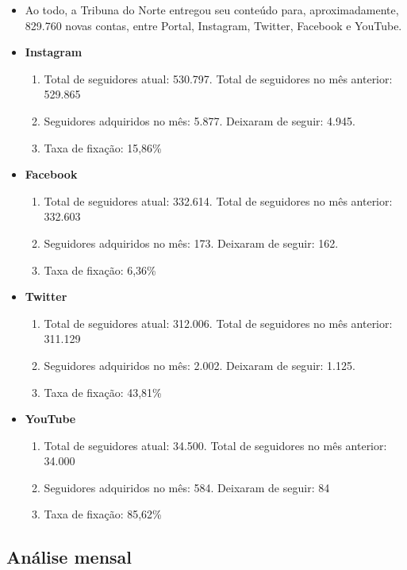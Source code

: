 \documentclass{article}%
\begin{document}
\begin{itemize}%
\item%
Ao todo, a Tribuna do Norte entregou seu conteúdo para, aproximadamente, 829.760 novas contas, entre Portal, Instagram, Twitter, Facebook e YouTube.%
\item%
\textbf{Instagram}%
\begin{enumerate}[label=-]%
\item%
Total de seguidores atual: 530.797. Total de seguidores no mês anterior: 529.865%
\item%
Seguidores adquiridos no mês: 5.877. Deixaram de seguir: 4.945.%
\item%
Taxa de fixação: 15,86\%%
\end{enumerate}%
\item%
\textbf{Facebook}%
\begin{enumerate}[label=-]%
\item%
Total de seguidores atual: 332.614. Total de seguidores no mês anterior: 332.603%
\item%
Seguidores adquiridos no mês: 173. Deixaram de seguir: 162.%
\item%
Taxa de fixação: 6,36\%%
\end{enumerate}%
\item%
\textbf{Twitter}%
\begin{enumerate}[label=-]%
\item%
Total de seguidores atual: 312.006. Total de seguidores no mês anterior: 311.129%
\item%
Seguidores adquiridos no mês: 2.002. Deixaram de seguir: 1.125.%
\item%
Taxa de fixação: 43,81\%%
\end{enumerate}%
\item%
\textbf{YouTube}%
\begin{enumerate}[label=-]%
\item%
Total de seguidores atual: 34.500. Total de seguidores no mês anterior: 34.000%
\item%
Seguidores adquiridos no mês: 584. Deixaram de seguir: 84%
\item%
Taxa de fixação: 85,62\%%
\end{enumerate}%
\end{itemize}

%
\newpage%
\subsection*{Análise mensal}%
\label{subsec:Anlisemensal}%
\end{document}
